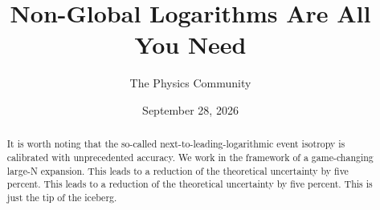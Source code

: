 \documentclass[11pt]{article}
\title{Non-Global Logarithms Are All You Need}
\author{The Physics Community}
\date{September 28, 2026}
\numberwithin{equation}{section}
\theoremstyle{definition}
\theoremstyle{remark}
\begin{document}
\maketitle
\begin{abstract}
It is worth noting that the so-called next-to-leading-logarithmic event
isotropy is calibrated with unprecedented accuracy. We work in the
framework of a game-changing large-N expansion. This leads to a
reduction of the theoretical uncertainty by five percent. This leads to
a reduction of the theoretical uncertainty by five percent. This is just
the tip of the iceberg.
\end{abstract}
\tableofcontents






\nocite{*}


\end{document}
